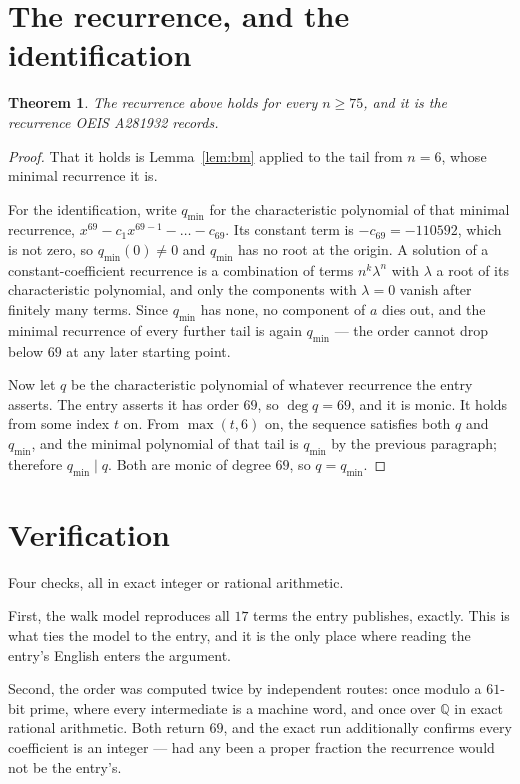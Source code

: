 \documentclass[11pt,a4paper]{article}
\theoremstyle{plain}
\newtheorem{theorem}{Theorem}
\theoremstyle{definition}
\begin{document}
\section{The recurrence, and the identification}

\begin{theorem}
The recurrence above holds for every $n\ge75$, and it is the recurrence OEIS A281932 records.
\end{theorem}

\begin{proof}
That it holds is Lemma~\ref{lem:bm} applied to the tail from $n=6$, whose minimal
recurrence it is.

For the identification, write $q_{\min}$ for the characteristic polynomial of that minimal
recurrence, $x^{69}-c_1x^{69-1}-\dots-c_{69}$. Its constant term is
$-c_{69}=-110592$, which is not zero, so $q_{\min}(0)\neq0$ and $q_{\min}$ has no
root at the origin. A solution of a constant-coefficient recurrence is a combination of terms
$n^{k}\lambda^{n}$ with $\lambda$ a root of its characteristic polynomial, and only the
components with $\lambda=0$ vanish after finitely many terms. Since $q_{\min}$ has none, no
component of $a$ dies out, and the minimal recurrence of every further tail is again
$q_{\min}$ --- the order cannot drop below $69$ at any later starting point.

Now let $q$ be the characteristic polynomial of whatever recurrence the entry asserts. The
entry asserts it has order $69$, so $\deg q=69$, and it is monic. It holds from some
index $t$ on. From $\max(t,6)$ on, the sequence satisfies both $q$ and $q_{\min}$, and
the minimal polynomial of that tail is $q_{\min}$ by the previous paragraph; therefore
$q_{\min}\mid q$. Both are monic of degree $69$, so $q=q_{\min}$.
\end{proof}

\section{Verification}

Four checks, all in exact integer or rational arithmetic.

First, the walk model reproduces all $17$ terms the entry publishes, exactly. This is
what ties the model to the entry, and it is the only place where reading the entry's English
enters the argument.

Second, the order was computed twice by independent routes: once modulo a $61$-bit prime, where
every intermediate is a machine word, and once over $\mathbb{Q}$ in exact rational arithmetic.
Both return $69$, and the exact run additionally confirms every coefficient is an integer
--- had any been a proper fraction the recurrence would not be the entry's.
\end{document}
